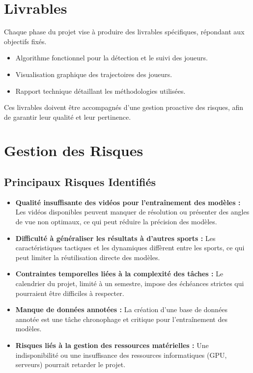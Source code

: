 \section{Livrables}
Chaque phase du projet vise à produire des livrables spécifiques, répondant aux objectifs fixés.
\begin{itemize}
    \item Algorithme fonctionnel pour la détection et le suivi des joueurs.
    \item Visualisation graphique des trajectoires des joueurs.
    \item Rapport technique détaillant les méthodologies utilisées.
\end{itemize}
Ces livrables doivent être accompagnés d'une gestion proactive des risques, afin de garantir leur qualité et leur pertinence.
\section{Gestion des Risques}

\subsection{Principaux Risques Identifiés}
\begin{itemize}
    \item \textbf{Qualité insuffisante des vidéos pour l’entraînement des modèles :} Les vidéos disponibles peuvent manquer de résolution ou présenter des angles de vue non optimaux, ce qui peut réduire la précision des modèles.
    \item \textbf{Difficulté à généraliser les résultats à d’autres sports :} Les caractéristiques tactiques et les dynamiques diffèrent entre les sports, ce qui peut limiter la réutilisation directe des modèles.
    \item \textbf{Contraintes temporelles liées à la complexité des tâches :} Le calendrier du projet, limité à un semestre, impose des échéances strictes qui pourraient être difficiles à respecter.
    \item \textbf{Manque de données annotées :} La création d’une base de données annotée est une tâche chronophage et critique pour l’entraînement des modèles.
    \item \textbf{Risques liés à la gestion des ressources matérielles :} Une indisponibilité ou une insuffisance des ressources informatiques (GPU, serveurs) pourrait retarder le projet.
\end{itemize}

